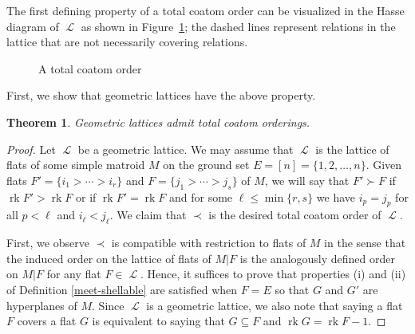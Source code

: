 \documentclass[11pt, reqno]{amsart}
\DeclareMathOperator{\LL}{\mathcal{L}}
\DeclareMathOperator{\rk}{rk}
\newtheorem{thm}{Theorem}[section]
\theoremstyle{definition}
\numberwithin{equation}{section}
\numberwithin{table}{section}
\begin{document}
\begin{spacing}{1.1}
\noindent The first defining property of a total coatom order can be visualized in the Hasse diagram of $\LL$ as shown in Figure~\ref{figure:tco}; the dashed lines represent relations in the lattice that are not necessarily covering relations.

\begin{figure}[th]
\caption{A total coatom order}\label{figure:tco}
\end{figure}

First, we show that geometric lattices have the above property.

\begin{thm} \label{geometric:lattices:are:meet-shellable}
Geometric lattices admit total coatom orderings.
\end{thm}

\begin{proof}
Let $\LL$ be a geometric lattice.  We may assume that $\LL$ is the lattice of flats of some simple matroid $M$ on the ground set $E = [n] = \{1, 2, \dots, n \}$.  Given flats $F' = \{i_1 > \cdots > i_r\}$ and $F = \{j_1 > \cdots > j_s\}$ of $M$, we will say that $F' \succ F$ if $\rk F' > \rk F$ or if $\rk F' = \rk F$ and for some $\ell \leq \min\{r, s\}$ we have $i_p = j_p$ for all $p < \ell$ and $i_\ell < j_\ell$.  We claim that $\prec$ is the desired total coatom order of $\LL$.  

First, we observe $\prec$ is compatible with restriction to flats of $M$ in the sense that  the induced order on the lattice of flats of $M\vert F$ is the analogously defined order on $M\vert F$ for any flat $F \in \LL$.  Hence, it suffices to prove that properties (i) and (ii) of Definition \ref{meet-shellable} are satisfied when $F = E$ so that $G$ and $G'$ are hyperplanes of $M$.  Since $\LL$ is a geometric lattice, we also note that saying a flat $F$ covers a flat $G$ is equivalent to saying that $G \subseteq F$ and $\rk G = \rk F - 1$.


\end{proof}
\end{spacing}
\end{document}
